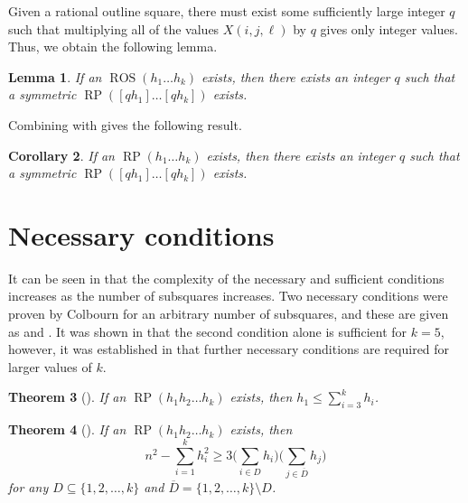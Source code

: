\documentclass[preprint,nonatbib]{elsarticle}
\DeclareMathOperator{\LS}{RP}
\DeclareMathOperator{\ROS}{ROS}
\newtheorem{theorem}{Theorem}[section]
\newtheorem{lemma}[theorem]{Lemma}
\newtheorem{corollary}[theorem]{Corollary}
\theoremstyle{definition}
\numberwithin{equation}{section}
\begin{document}
Given a rational outline square, there must exist some sufficiently large integer $q$ such that multiplying all of the values $X(i,j,\ell)$ by $q$ gives only integer values. Thus, we obtain the following lemma.

\begin{lemma}
\label{lemma: always outline for multiple of P}
    If an $\ROS(h_1\dots h_k)$ exists, then there exists an integer $q$ such that a symmetric $\LS([qh_1]\dots[qh_k])$ exists.
\end{lemma}

Combining  with  gives the following result.

\begin{corollary}
    If an $\LS(h_1\dots h_k)$ exists, then there exists an integer $q$ such that a symmetric $\LS([qh_1]\dots[qh_k])$ exists.
\end{corollary}




\section{Necessary conditions}

It can be seen in  that the complexity of the necessary and sufficient conditions increases as the number of subsquares increases. Two necessary conditions were proven by Colbourn \cite{colbourn2018latin} for an arbitrary number of subsquares, and these are given as  and . It was shown in \cite{kemp2024latin} that the second condition alone is sufficient for $k=5$, however, it was established in \cite{colbourn2018latin} that further necessary conditions are required for larger values of $k$.

\begin{theorem}[\cite{colbourn2018latin}]
\label{condition: squarecondition1}
    If an $\LS(h_1h_2\dots h_k)$ exists, then $h_1\leq\sum_{i=3}^kh_i$.
\end{theorem}

\begin{theorem}[\cite{colbourn2018latin}]
\label{condition: squarecondition2}
    If an $\LS(h_1h_2\dots h_k)$ exists, then $$n^2 - \sum_{i=1}^kh_i^2\geq 3\Bigg( \sum_{i\in D}h_i\Bigg)\Bigg(\sum_{j\in\overline{D}}h_j\Bigg)$$ for any $D\subseteq\{1,2,\dots,k\}$ and $\overline{D} = \{1,2,\dots,k\}\setminus D$.
\end{theorem}
\end{document}
